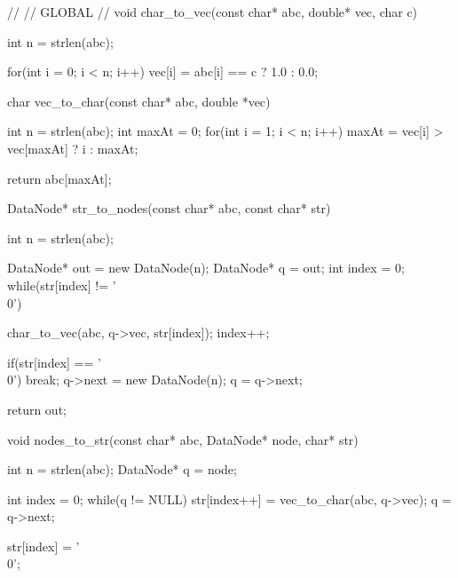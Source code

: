 //
// GLOBAL
//
void char\_to\_vec(const char* abc, double* vec, char c){
  int n = strlen(abc);


  for(int i = 0; i < n; i++)
    vec[i] = abc[i] == c ? 1.0 : 0.0;

}

char vec\_to\_char(const char* abc, double *vec){
  int n = strlen(abc);
  int maxAt = 0;
  for(int i = 1; i < n; i++)
    maxAt = vec[i] > vec[maxAt] ? i : maxAt;

  return abc[maxAt];
}

DataNode* str\_to\_nodes(const char* abc, const char* str){
  int n = strlen(abc);

  DataNode* out = new DataNode(n);
  DataNode* q = out;
  int index = 0;
  while(str[index] != '\\0'){
    char\_to\_vec(abc, q->vec, str[index]);
    index++;

    if(str[index] == '\\0') break;
    q->next = new DataNode(n);
    q = q->next;
  }

  return out;

}

void nodes\_to\_str(const char* abc, DataNode* node, char* str){
  int n = strlen(abc);
  DataNode* q = node;

  int index = 0;
  while(q != NULL){
    str[index++] = vec\_to\_char(abc, q->vec);
    q = q->next;
  }

  str[index] = '\\0';

}
